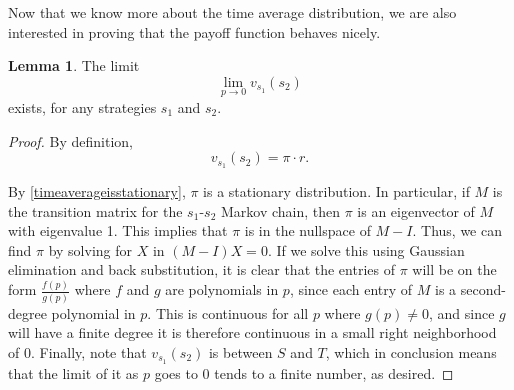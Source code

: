 \documentclass[11pt]{amsart}
\theoremstyle{definition}
\newtheorem{lemma}[theorem]{Lemma}
\theoremstyle{remark}
\begin{document}



Now that we know more about the time average distribution, we are also interested in proving that the payoff function behaves nicely.

\begin{lemma}
  \label{limitvexists}
  The limit \begin{equation*}
    \lim_{p \to 0} v_{s_1}(s_2)
  \end{equation*}
  exists, for any strategies $s_1$ and $s_2$.
\end{lemma}
\begin{proof}
  By definition, \begin{equation*}
    v_{s_1}(s_2) = \pi \cdot r.
  \end{equation*}

  By \cref{timeaverageisstationary}, $\pi$ is a stationary distribution. In particular, if $M$ is the transition matrix for the $s_1$-$s_2$ Markov chain, then $\pi$ is an eigenvector of $M$ with eigenvalue 1. This implies that $\pi$ is in the nullspace of $M - I$. Thus, we can find $\pi$ by solving for $X$ in $(M - I)X = 0$. If we solve this using Gaussian elimination and back substitution, it is clear that the entries of $\pi$ will be on the form $\frac{f(p)}{g(p)}$ where $f$ and $g$ are polynomials in $p$, since each 
  entry of $M$ is a second-degree polynomial in $p$. This is continuous for all $p$ where $g(p) \neq 0$, and since $g$ will have a finite degree it is therefore continuous in a small right neighborhood of 0. Finally, note that $v_{s_1}(s_2)$ is between $S$ and $T$, which in conclusion means that the limit of it as $p$ goes to 0 tends to a finite number, as desired.
\end{proof}
\end{document}
